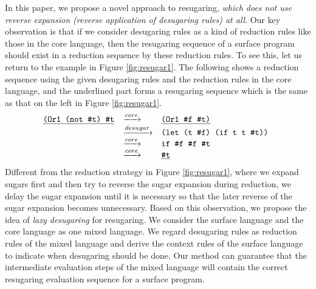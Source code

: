 \label{mark:mention}
In this paper, we propose a novel approach to resugaring, \emph{which does not use reverse expansion (reverse application of desugaring rules) at all}. Our key observation is that
if we consider desugaring rules as a kind of reduction rules like those in the core language,  then the resugaring sequence of a surface program should exist in a reduction sequence by these reduction rules. To see this, let us return to the example in Figure \ref{fig:resugar1}. The following shows a reduction sequence using the given desugaring rules and the reduction rules in the core language, and the underlined part forms a  resugaring sequence which is the same as that on the left in Figure \ref{fig:resugar1}.
\[
\begin{array}{llll}
\underline{\texttt{(Or1 (not \#t) \#t}}
  & \xrightarrow{core} & \underline{\texttt{(Or1 \#f \#t)}}\\
  & \xrightarrow{desugar} & \texttt{(let (t \#f) (if t t \#t)) }\\
	& \xrightarrow{core} & \texttt{if \#f \#f \#t}\\
	& \xrightarrow{core} & \underline{\texttt{\#t}}
\end{array}
\]
Different from the reduction strategy in Figure \ref{fig:resugar1}, where we expand sugars first and then try to reverse the sugar expansion during reduction, we delay the sugar expansion until it is necessary so that the later reverse of the sugar expansion becomes unnecessary.
Based on this observation, we propose the idea of {\em lazy desugaring} for resugaring.
We consider the surface language and the core language as one mixed language. We regard desugaring rules as reduction rules of the mixed language and derive the context rules of the surface language to indicate when desugaring should be done. Our method can guarantee that the intermediate evaluation steps of the mixed language will contain the correct resugaring evaluation sequence for a surface program.


